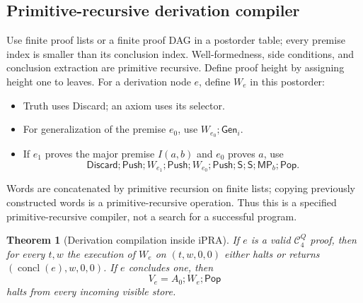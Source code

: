 \documentclass[11pt,a4paper]{article}
\newtheorem{theorem}{Theorem}[section]
\newcommand{\ipra}{\mathrm{iPRA}}
\newcommand{\MP}{\mathsf{MP}}
\newcommand{\Shift}{\mathsf{S}}
\newcommand{\Push}{\mathsf{Push}}
\newcommand{\Pop}{\mathsf{Pop}}
\newcommand{\Discard}{\mathsf{Discard}}
\newcommand{\Gen}{\mathsf{Gen}}
\begin{document}
\subsection{Primitive-recursive derivation compiler}

Use finite proof lists or a finite proof DAG in a postorder table; every
premise index is smaller than its conclusion index. Well-formedness,
side conditions, and conclusion extraction are primitive recursive.
Define proof height by assigning height one to leaves.
For a derivation node $e$, define $W_e$ in this postorder:
\begin{itemize}
\item Truth uses Discard; an axiom uses its selector.
\item For generalization of the premise $e_0$, use
$W_{e_0};\Gen_i$.
\item If $e_1$ proves the major premise $I(a,b)$ and $e_0$ proves $a$,
use
\[
 \Discard;\Push;W_{e_1};\Push;W_{e_0};\Push;
                        \Shift;\Shift;\MP_b;\Pop.
\]
\end{itemize}
Words are concatenated by primitive recursion on finite lists; copying
previously constructed words is a primitive-recursive operation.
Thus this is a specified primitive-recursive compiler, not a search
for a successful program.

\begin{theorem}[Derivation compilation inside $\ipra$]
If $e$ is a valid $\mathcal C^Q_4$ proof, then for every $t,w$ the
execution of $W_e$ on $(t,w,0,0)$ either halts or returns
$(\operatorname{concl}(e),w,0,0)$. If $e$ concludes one, then
\[
 V_e=A_0;W_e;\Pop
\]
halts from every incoming visible store.
\end{theorem}
\end{document}

